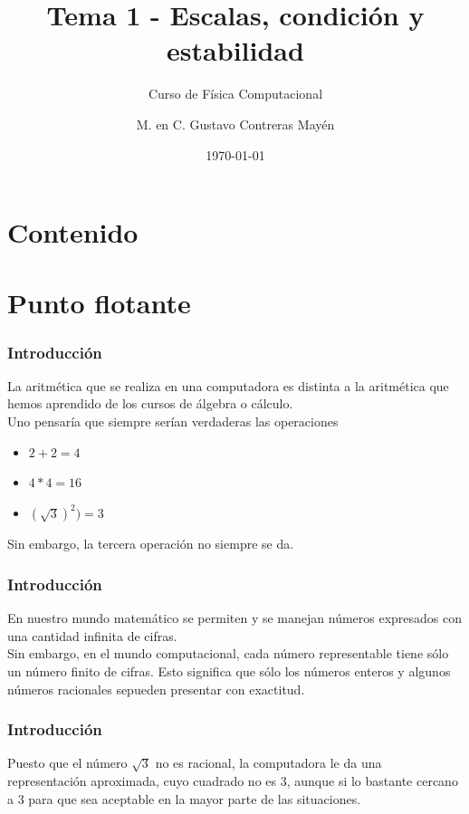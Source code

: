 
\title{\large{Tema 1 - Escalas, condición y estabilidad}}
\subtitle{Curso de Física Computacional}
\author[]{M. en C. Gustavo Contreras Mayén}
\date{\today}

\maketitle
\section*{Contenido}
\fontsize{14}{14}\selectfont
{}
\section{Punto flotante}
\begin{frame}
\frametitle{Introducción}
La aritmética que se realiza en una computadora es distinta a la aritmética que hemos aprendido de los cursos de álgebra o cálculo.
\\
\bigskip
\pause
Uno pensaría que siempre serían verdaderas las operaciones
\begin{itemize}
\item $2 + 2 = 4$
\item $4 * 4 = 16$
\item $(\sqrt{3})^{2}) = 3$
\end{itemize}
Sin embargo, la tercera  operación no siempre se da.
\end{frame}
\begin{frame}
\frametitle{Introducción}
En nuestro mundo matemático se permiten y se manejan  números expresados con una cantidad infinita de cifras.
\\
\bigskip
\pause
Sin embargo, en el mundo computacional, cada número representable tiene sólo un número finito de cifras. Esto significa que sólo los números enteros y algunos números racionales sepueden presentar con exactitud. 
\end{frame}
\begin{frame}
\frametitle{Introducción}
Puesto que el número $\sqrt{3}$ no es racional, la computadora le da una representación aproximada, cuyo cuadrado no es $3$, aunque si lo bastante cercano a $3$ para que sea aceptable en la mayor parte de las situaciones.
\end{frame}
